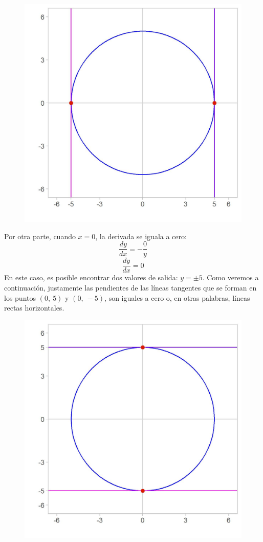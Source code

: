 \documentclass[12pt]{article}
\begin{document}
\begin{figure}[hbt!]
\centering
\includegraphics[scale=0.7]{img/implicit_diff_3.jpg}
\end{figure}

Por otra parte, cuando $x = 0$, la derivada se iguala a cero:
\[\frac{dy}{dx} = - \frac{0}{y}\]
\[\frac{dy}{dx} = 0\]
En este caso, es posible encontrar dos valores de salida: $y = \pm 5$. Como veremos a continuación, justamente las pendientes de las líneas tangentes que se forman en los puntos $(0, \ 5)$ y $(0, \ -5)$, son iguales a cero o, en otras palabras, líneas rectas horizontales.

\newpage

\begin{figure}[hbt!]
\centering
\includegraphics[scale=0.7]{img/implicit_diff_4.jpg}
\end{figure}
\end{document}
